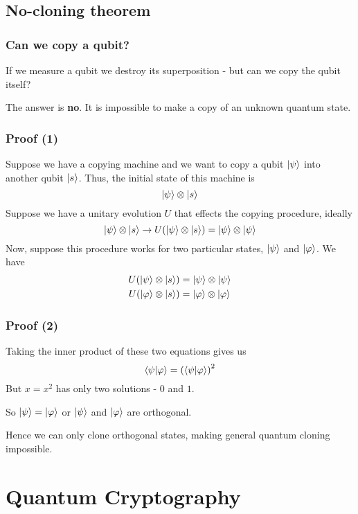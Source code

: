 \documentclass{beamer}
\begin{document}
  \subsection{No-cloning theorem}
  \begin{frame}
    \frametitle{Can we copy a qubit?}
    If we measure a qubit we destroy its superposition - but can we copy the qubit itself?
    
    The answer is \textbf{no}. It is impossible to make a copy of an unknown quantum state.
  \end{frame}
  \begin{frame}
    \frametitle{Proof (1)}
    Suppose we have a copying machine and we want to copy a qubit $\ket{\psi}$ into another qubit $\ket{s}$.
    Thus, the initial state of this machine is
    \begin{equation*}
      \ket{\psi} \otimes \ket{s}
    \end{equation*}
    \pause
    Suppose we have a unitary evolution $U$ that effects the copying procedure, ideally
    \begin{equation*}
      \ket{\psi} \otimes \ket{s} \to U(\ket{\psi} \otimes \ket{s}) = \ket{\psi} \otimes \ket{\psi}
    \end{equation*}
    \pause
    Now, suppose this procedure works for two particular states, $\ket{\psi}$ and $\ket{\varphi}$.
    We have
    \begin{align*}
      U(\ket{\psi}\otimes\ket{s}) &= \ket{\psi}\otimes\ket{\psi} \\
      U(\ket{\varphi}\otimes\ket{s}) &= \ket{\varphi}\otimes\ket{\varphi}
    \end{align*}
  \end{frame}
  \begin{frame}
    \frametitle{Proof (2)}
    Taking the inner product of these two equations gives us
    \begin{equation*}
      \braket{\psi|\varphi} = \left(\braket{\psi|\varphi}\right)^2
    \end{equation*}
    \pause
    But $x = x^2$ has only two solutions - $0$ and $1$.

    \pause
    So $\ket{\psi} = \ket{\varphi}$ or $\ket{\psi}$ and $\ket{\varphi}$ are orthogonal.

    Hence we can only clone orthogonal states, making general quantum cloning impossible.
  \end{frame}

  \section{Quantum Cryptography}
\end{document}

